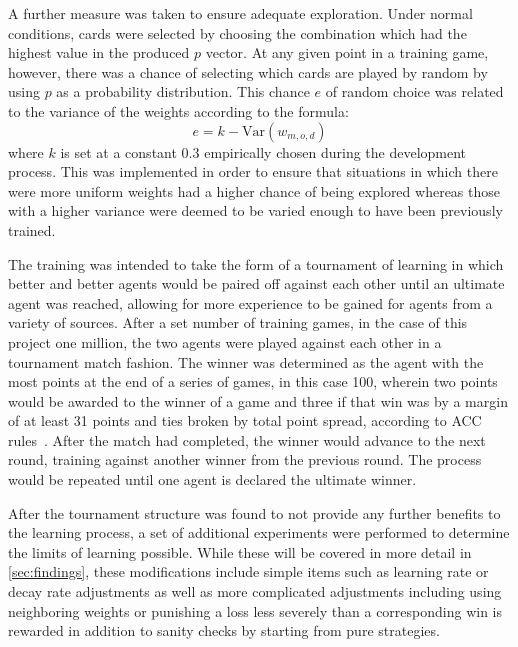 \newcommand{\Var}{\mathrm{Var}}
A further measure was taken to ensure adequate exploration.
%
Under normal conditions,
cards were selected by choosing the combination which had the highest value in
the produced $p$ vector.
%
At any given point in a training game, however,
there was a chance of selecting which cards are played
by random by using $p$ as a probability distribution.
%
This chance $e$ of random choice was related to the variance of the 
weights according to the formula:
\[
	e = k - \Var(w_{m,o,d})
\]
where $k$ is set at a constant $0.3$ empirically chosen during the
development process.
%
This was implemented in order to ensure that situations in which there were
more uniform weights had a higher chance of being explored
whereas those with a higher variance were deemed to be varied enough to
have been previously trained.

The training was intended to take the form of a tournament of learning in which
better and better agents would be paired off against each other until an
ultimate agent was reached,
allowing for more experience to be gained for agents from a variety of sources.
%
After a set number of training games,
in the case of this project one million,
the two agents were played against each other in a tournament match fashion.
%
The winner was determined as the agent with the most points at the end
of a series of games, %
in this case 100, %
wherein two points would be awarded to the winner of a game and three if that
win was by a margin of at least 31 points
and ties broken by total point spread,
according to ACC rules~\cite{ACC_rules}.
%
After the match had completed,
the winner would advance to the next round,
training against another winner from the previous round.
%
The process would be
repeated until one agent is declared the ultimate winner.

After the tournament structure was found to not provide any further benefits
to the learning process,
a set of additional experiments were performed to determine the limits of
learning possible.
%
While these will be covered in more detail in \ref{sec:findings},
these modifications include simple items such as learning rate or decay rate 
adjustments
as well as
more complicated adjustments
including using neighboring weights
or punishing a loss less severely than a corresponding win is rewarded
in addition to sanity checks by starting from pure strategies.

